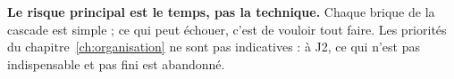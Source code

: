\begin{cle}
\textbf{Le risque principal est le temps, pas la technique.} Chaque brique de la cascade est
simple ; ce qui peut échouer, c'est de vouloir tout faire. Les priorités du
chapitre~\ref{ch:organisation} ne sont pas indicatives : à J2, ce qui n'est pas indispensable et
pas fini est abandonné.
\end{cle}
